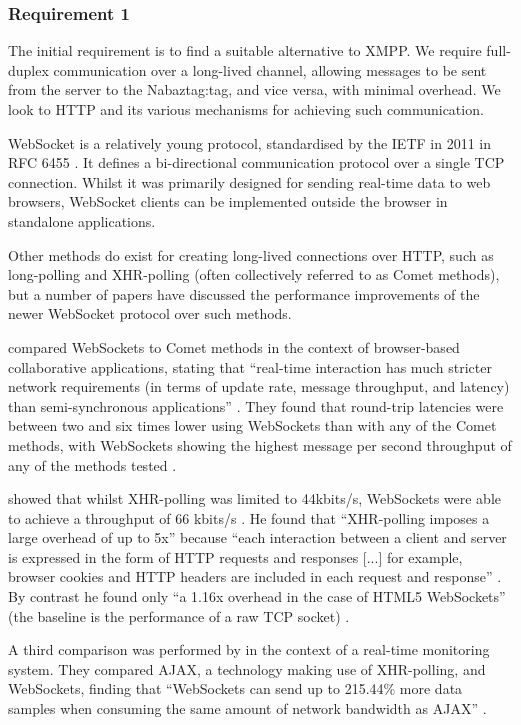 \documentclass[12pt, a4paper]{article}
\begin{document}
\subsubsection{Requirement 1}\label{sec:require1}
The initial requirement is to find a suitable alternative to \ac{XMPP}. We require full-duplex communication over a long-lived channel,  allowing messages to be sent from the server to the Nabaztag:tag, and vice versa, with minimal overhead. We look to \ac{HTTP} and its various mechanisms for achieving such communication.
	
WebSocket is a relatively young protocol, standardised by the \ac{IETF} in 2011 in \ac{RFC} 6455 \parencite{rfc6455}. It defines a bi-directional communication protocol over a single TCP connection. Whilst it was primarily designed for sending real-time data to web browsers, WebSocket clients can be implemented outside the browser in standalone applications.

Other methods do exist for creating long-lived connections over \ac{HTTP}, such as long-polling and \ac{XHR}-polling (often collectively referred to as Comet methods), but a number of papers have discussed the performance improvements of the newer WebSocket protocol over such methods.
		
\citeauthor{Gutwin2011} compared WebSockets to Comet methods in the context of browser-based collaborative applications, stating that ``real-time interaction has much stricter network requirements (in terms of update rate, message throughput, and latency) than semi-synchronous applications'' \parencite{Gutwin2011}. They found that round-trip latencies were between two and six times lower using WebSockets than with any of the Comet methods, with WebSockets showing the highest message per second throughput of any of the methods tested \parencite{Gutwin2011}. 
		
\citeauthor{Agarwal2012} showed that whilst \ac{XHR}-polling was limited to 44kbits/s, WebSockets were able to achieve a throughput of 66 kbits/s \parencite{Agarwal2012}. He found that ``XHR-polling imposes a large overhead of up to 5x'' because ``each interaction between a client and server is expressed in the form of HTTP requests and responses [...] for example, browser cookies and HTTP headers are included in each request and response'' \parencite{Agarwal2012}. By contrast he found only ``a 1.16x overhead in the case of HTML5 WebSockets'' (the baseline is the performance of a raw TCP socket) \parencite{Agarwal2012}.
	  
A third comparison was performed by \citeauthor{Puranik2013} in the context of a real-time monitoring system. They compared \ac{AJAX}, a technology making use of \ac{XHR}-polling, and WebSockets, finding that ``WebSockets can send up to 215.44\% more data samples when consuming the same amount of network bandwidth as \ac{AJAX}'' \parencite{Puranik2013}.
\end{document}
